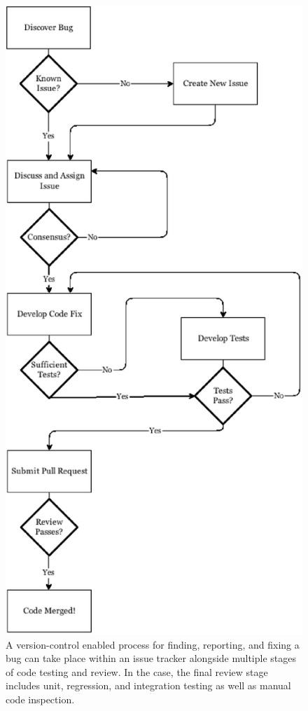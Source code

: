 \begin{figure}[htbp]
\begin{center}
\includegraphics[height=0.6\textheight]{./images/gitprocess}
\end{center}
\caption{A version-control enabled process for finding, reporting, and fixing a bug 
can take place within an issue tracker alongside multiple stages of code 
testing and review. In the \Cyclus case, the final review stage includes unit, 
regression, and integration testing as well as manual code inspection.}
\label{fig:gitprocess}
\end{figure}

